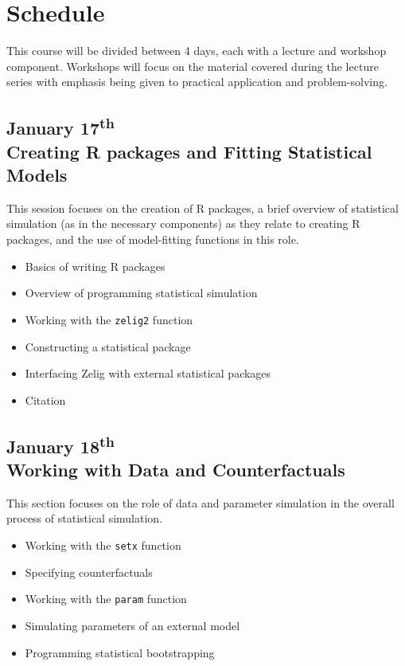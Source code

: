 \documentclass{article}
\begin{document}
%
\section{Schedule}
\label{schedule}

This course will be divided between 4 days, each with a lecture and workshop component.
Workshops will focus on the material covered during the lecture series with emphasis 
being given to practical application and problem-solving.


\subsection{January 17\textsuperscript{th} \\ Creating R packages and Fitting Statistical Models}
  
This session focuses on the creation of R packages, a brief overview of
statistical simulation (as in the necessary components) as they relate to
creating R packages, and the use of model-fitting functions in this role.
  
\begin{itemize}
  \item Basics of writing R packages
  \item Overview of programming statistical simulation
  \item Working with the {\tt zelig2} function
  \item Constructing a statistical package
  \item Interfacing Zelig with external statistical packages
  \item Citation
\end{itemize}


\subsection{
  January 18\textsuperscript{th} \\
  Working with Data and Counterfactuals
}

This section focuses on the role of data and parameter simulation in the overall
process of statistical simulation.

\begin{itemize}
  \item Working with the {\tt setx} function
  \item Specifying counterfactuals
  \item Working with the {\tt param} function
  \item Simulating parameters of an external model
  \item Programming statistical bootstrapping
\end{itemize}
\end{document}
